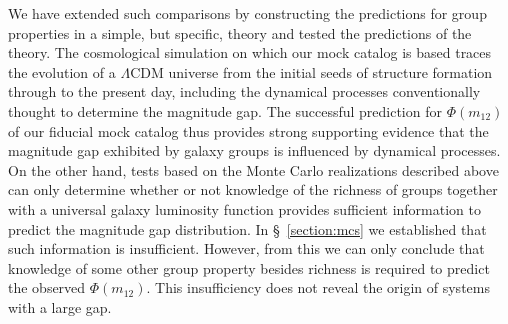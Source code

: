 \documentclass[usenatbib,usegraphicx,letterpaper]{mn2e}
\newcommand{\monetwo}{m_{12}}
\newcommand{\lcdm}{\Lambda\mathrm{CDM}}
\begin{document}
We have extended such comparisons by constructing the predictions 
for group properties in a simple, but specific, theory and tested 
the predictions of the theory.  The cosmological simulation on which our mock
catalog is based traces the evolution of a $\lcdm$ universe from the
initial seeds of structure formation through to the present day,
including the dynamical processes conventionally thought to
determine the magnitude gap. The successful prediction for
$\Phi(\monetwo)$ of our fiducial mock catalog thus provides strong
supporting evidence that the magnitude gap exhibited by galaxy groups
is influenced by dynamical processes. On the other hand, tests based
on the Monte Carlo realizations described above can only determine
whether or not knowledge of the richness of groups together with a
universal galaxy luminosity function provides sufficient information
to predict the magnitude gap distribution. In \S~\ref{section:mcs} we
established that such information is insufficient. However, from this
we can only conclude that knowledge of some other group property
besides richness is required to predict the observed $\Phi(\monetwo)$. 
This insufficiency does not reveal the origin of
systems with a large gap.
\end{document}
